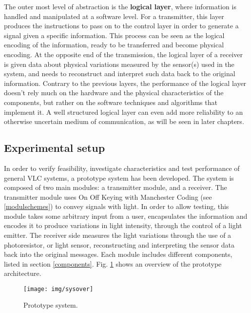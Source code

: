 The outer most level of abstraction is the \textbf{logical layer}, where information is handled and manipulated at a software level.
For a transmitter, this layer produces the instructions to pass on to the control layer in order to generate a signal given a specific information. 
This process can be seen as the logical encoding of the information, ready to be transferred and become physical encoding.
At the opposite end of the transmission, the logical layer of a receiver is given data about physical variations measured by the sensor(s) used in the system, and needs to reconstruct and interpret such data back to the original information.
Contrary to the previous layers, the performance of the logical layer doesn't rely much on the hardware and the physical characteristics of the components, but rather on the software techniques and algorithms that implement it.
A well structured logical layer can even add more reliability to an otherwise uncertain medium of communication, as will be seen in later chapters.


\subsection{Experimental setup}

In order to verify feasibility, investigate characteristics and test performance of general VLC systems, a prototype system has been developed.
The system is composed of two main modules: a transmitter module, and a receiver.
The transmitter module uses On Off Keying with Manchester Coding (see \ref{modulschemes})  to convey signals with light.
In order to allow testing, this module takes some arbitrary input from a user, encapsulates the information and encodes it to produce variations in light intensity, through the control of a light emitter.
The receiver side measures the light variations through the use of a photoresistor, or light sensor, reconstructing and interpreting the sensor data back into the original messages. 
Each module includes different components, listed in section \ref{components}.
Fig. \ref{fig:sys over} shows an overview of the prototype architecture.

\begin{figure}
\centering
\texttt{[image: img/sysover]}
\caption{Prototype system.}
\label{fig:sys over}
\end{figure}

